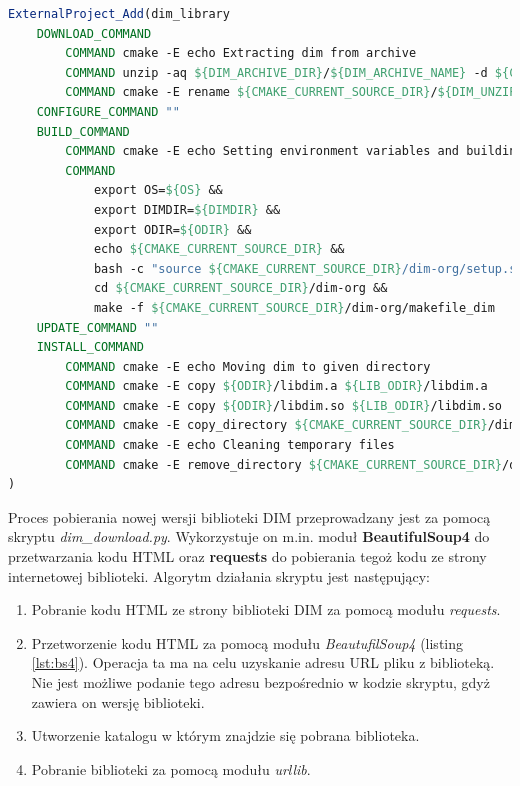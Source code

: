 \begin{lstlisting}[language=cmake, caption={Fragment pliku \textit{CMakeLists.txt} przeznaczonego do konfiguracji procesu budowania biblioteki DIM. Widoczne zastosowanie funkcjonalności \textit{ExternalProject} pozwalającej na wykorzystanie plików \textit{Makefile} (makefile\_dim) dostarczonych przez autorów biblioteki.}, label={lst:dimexternal}]
ExternalProject_Add(dim_library
    DOWNLOAD_COMMAND 
        COMMAND cmake -E echo Extracting dim from archive
        COMMAND unzip -aq ${DIM_ARCHIVE_DIR}/${DIM_ARCHIVE_NAME} -d ${CMAKE_CURRENT_SOURCE_DIR}
        COMMAND cmake -E rename ${CMAKE_CURRENT_SOURCE_DIR}/${DIM_UNZIP_OUTPUT_DIRECTORY} ${CMAKE_CURRENT_SOURCE_DIR}/dim-org
    CONFIGURE_COMMAND ""
    BUILD_COMMAND 
        COMMAND cmake -E echo Setting environment variables and building
        COMMAND 
            export OS=${OS} && 
            export DIMDIR=${DIMDIR} && 
            export ODIR=${ODIR} && 
            echo ${CMAKE_CURRENT_SOURCE_DIR} && 
            bash -c "source ${CMAKE_CURRENT_SOURCE_DIR}/dim-org/setup.sh" && 
            cd ${CMAKE_CURRENT_SOURCE_DIR}/dim-org && 
            make -f ${CMAKE_CURRENT_SOURCE_DIR}/dim-org/makefile_dim
    UPDATE_COMMAND ""
    INSTALL_COMMAND 
        COMMAND cmake -E echo Moving dim to given directory
        COMMAND cmake -E copy ${ODIR}/libdim.a ${LIB_ODIR}/libdim.a
        COMMAND cmake -E copy ${ODIR}/libdim.so ${LIB_ODIR}/libdim.so
        COMMAND cmake -E copy_directory ${CMAKE_CURRENT_SOURCE_DIR}/dim-org/dim ${INCLUDE_ODIR}/dim
        COMMAND cmake -E echo Cleaning temporary files
        COMMAND cmake -E remove_directory ${CMAKE_CURRENT_SOURCE_DIR}/dim-org
)
\end{lstlisting}

Proces pobierania nowej wersji biblioteki DIM przeprowadzany jest za pomocą skryptu \textit{dim\_download.py}. Wykorzystuje on m.in. moduł \textbf{BeautifulSoup4} do przetwarzania kodu HTML oraz \textbf{requests} do pobierania tegoż kodu ze strony internetowej biblioteki. Algorytm działania skryptu jest następujący:
\begin{enumerate}
\item Pobranie kodu HTML ze strony biblioteki DIM za pomocą modułu \textit{requests}.
\item Przetworzenie kodu HTML za pomocą modułu \textit{BeautufilSoup4} (listing \ref{lst:bs4}). Operacja ta ma na celu uzyskanie adresu URL pliku z biblioteką. Nie jest możliwe podanie tego adresu bezpośrednio w kodzie skryptu, gdyż zawiera on wersję biblioteki. 
\item Utworzenie katalogu w którym znajdzie się pobrana biblioteka.
\item Pobranie biblioteki za pomocą modułu \textit{urllib}.
\end{enumerate}


